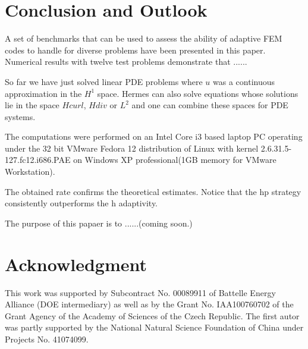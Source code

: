 \section{Conclusion and Outlook}
\label{sec:conclusion}

A set of benchmarks that can be used to assess the
ability of adaptive FEM codes to handle for diverse
problems have been presented in this paper.
Numerical results with twelve test problems demonstrate
that ......

So far we have just solved linear PDE problems where $u$
was a continuous approximation in the $H^1$ space.
Hermes can also solve equations whose solutions lie in the space
$Hcurl$, $Hdiv$ or $L^2$ and one can combine these spaces for PDE systems.

The computations were performed on an Intel Core i3 based laptop PC
operating under the 32 bit VMware Fedora 12 distribution
of Linux with kernel 2.6.31.5-127.fc12.i686.PAE
on Windows XP professional(1GB memory for VMware Workstation). 

The obtained rate confirms the theoretical estimates. 
Notice that the hp strategy consistently outperforms the h adaptivity.

The purpose of this papaer is to ......(coming soon.)

\section{Acknowledgment}

This work was supported by Subcontract No. 00089911 of Battelle
Energy Alliance (DOE intermediary) as well as by the
Grant No. IAA100760702 of the Grant Agency of the Academy
of Sciences of the Czech Republic. The first autor was partly
supported by the National Natural Science Foundation
of China under Projects No. 41074099.
